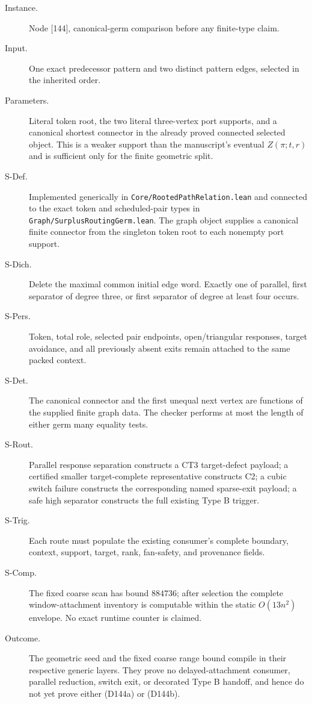 \documentclass[11pt]{article}
\begin{document}
\begin{description}
\item[Instance.] Node [144], canonical-germ comparison before any finite-type
claim.
\item[Input.] One exact predecessor pattern and two distinct pattern edges,
selected in the inherited order.
\item[Parameters.] Literal token root, the two literal three-vertex port
supports, and a canonical shortest connector in the already proved connected
selected object.  This is a weaker support than the manuscript's eventual
$Z(\pi;t,r)$ and is sufficient only for the finite geometric split.
\item[S-Def.] Implemented generically in
\texttt{Core/RootedPathRelation.lean} and connected to the exact token and
scheduled-pair types in
\texttt{Graph/SurplusRoutingGerm.lean}.  The graph object supplies a canonical
finite connector from the singleton token root to each nonempty port support.
\item[S-Dich.] Delete the maximal common initial edge word.  Exactly one of
parallel, first separator of degree three, or first separator of degree at
least four occurs.
\item[S-Pers.] Token, total role, selected pair endpoints, open/triangular
responses, target avoidance, and all previously absent exits remain attached
to the same packed context.
\item[S-Det.] The canonical connector and the first unequal next vertex are
functions of the supplied finite graph data.  The checker performs at most
the length of either germ many equality tests.
\item[S-Rout.] Parallel response separation constructs a CT3 target-defect
payload; a certified smaller target-complete representative constructs C2;
a cubic switch failure constructs the corresponding named sparse-exit
payload; a safe high separator constructs the full existing Type B trigger.
\item[S-Trig.] Each route must populate the existing consumer's complete
boundary, context, support, target, rank, fan-safety, and provenance fields.
\item[S-Comp.] The fixed coarse scan has bound $884736$; after selection the
complete window-attachment inventory is computable within the static
$O(13n^2)$ envelope.  No exact runtime counter is claimed.
\item[Outcome.] The geometric seed and the fixed coarse range bound compile in
their respective generic layers.  They prove no delayed-attachment consumer,
parallel reduction, switch exit, or decorated Type B handoff, and hence do not
yet prove either (D144a) or (D144b).
\end{description}
\end{document}
